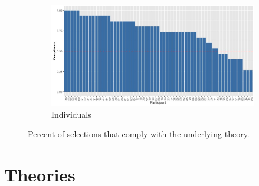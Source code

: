 \documentclass{article}
\begin{document}
\begin{figure}[h!]
  \begin{subfigure}[t]{0.9\textwidth}
    \centering
    \includegraphics[width=\linewidth]{com_ind} 
    \caption{Individuals}
  \end{subfigure}
  \caption{Percent of selections that comply with the underlying theory.}
  \label{fig:compliance}
\end{figure}

\section{Theories}
\end{document}

